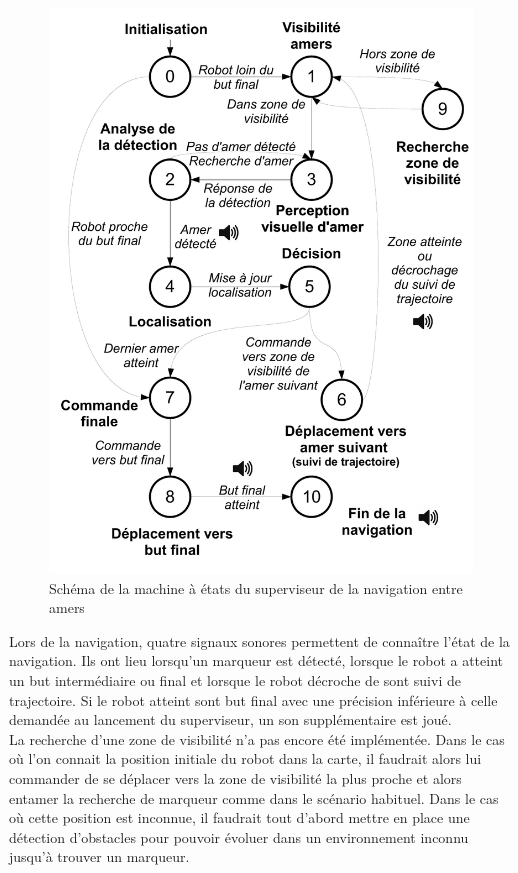 \documentclass[10pt,a4paper]{article}
\begin{document}
\begin{figure}[!h]
\centering\includegraphics[scale=0.5]{figures/HLC_MEF.pdf}
\caption{Schéma de la machine à états du superviseur de la navigation entre amers}
\label{HLC_MEF}
\end{figure}

Lors de la navigation, quatre signaux sonores permettent de connaître l'état de la navigation. Ils ont lieu lorsqu'un marqueur est détecté, lorsque le robot a atteint un but intermédiaire ou final et lorsque le robot décroche de sont suivi de trajectoire. Si le robot atteint sont but final avec une précision inférieure à celle demandée au lancement du superviseur, un son supplémentaire est joué.\\

La recherche d'une zone de visibilité n'a pas encore été implémentée. Dans le cas où l'on connait la position initiale du robot dans la carte, il faudrait alors lui commander de se déplacer vers la zone de visibilité la plus proche et alors entamer la recherche de marqueur comme dans le scénario habituel. Dans le cas où cette position est inconnue, il faudrait tout d'abord mettre en place une détection d'obstacles pour pouvoir évoluer dans un environnement inconnu jusqu'à trouver un marqueur.
\end{document}

